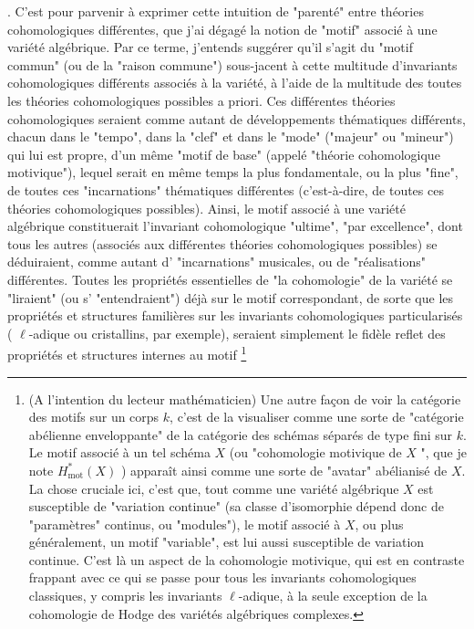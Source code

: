{}. C’est pour parvenir à exprimer cette intuition de "parenté" entre théories cohomologiques différentes, que j'ai dégagé la notion de "motif" associé à une variété algébrique. Par ce terme, j'entends suggérer qu'il s'agit du "motif commun" (ou de la "raison commune") sous-jacent à cette multitude d'invariants cohomologiques différents associés à la variété, à l'aide de la multitude des toutes les théories cohomologiques possibles a priori. Ces différentes théories cohomologiques seraient comme autant de développements thématiques différents, chacun dans le "tempo", dans la "clef" et dans le "mode" ("majeur" ou "mineur") qui lui est propre, d'un même "motif de base" (appelé "théorie cohomologique motivique"), lequel serait en même temps la plus fondamentale, ou la plus "fine", de toutes ces "incarnations" thématiques différentes (c'est-à-dire, de toutes ces théories cohomologiques possibles). Ainsi, le motif associé à une variété algébrique constituerait l'invariant cohomologique "ultime", "par excellence", dont tous les autres (associés aux différentes théories cohomologiques possibles) se déduiraient, comme autant d' "incarnations" musicales, ou de "réalisations" différentes. Toutes les propriétés essentielles de "la cohomologie" de la variété se "liraient" (ou s' "entendraient") déjà sur le motif correspondant, de sorte que les propriétés et structures familières sur les invariants cohomologiques particularisés ( $\ell$-adique ou cristallins, par exemple), seraient simplement le fidèle reflet des propriétés et structures internes au motif \footnote{(A l'intention du lecteur mathématicien) Une autre façon de voir la catégorie des motifs sur un corps $k$, c'est de la visualiser comme une sorte de "catégorie abélienne enveloppante" de la catégorie des schémas séparés de type fini sur $k$. Le motif associé à un tel schéma $X$ (ou "cohomologie motivique de $X$ ", que je note $H_{\text {mot}}^{*}(X)$ ) apparaît ainsi comme une sorte de "avatar" abélianisé de $X$. La chose cruciale ici, c'est que, tout comme une variété algébrique $X$ est susceptible de "variation continue" (sa classe d'isomorphie dépend donc de "paramètres" continus, ou "modules"), le motif associé à $X$, ou plus généralement, un motif "variable", est lui aussi susceptible de variation continue. C'est là un aspect de la cohomologie motivique, qui est en contraste frappant avec ce qui se passe pour tous les invariants cohomologiques classiques, y compris les invariants $\ell$-adique, à la seule exception de la cohomologie de Hodge des variétés algébriques complexes.

}
